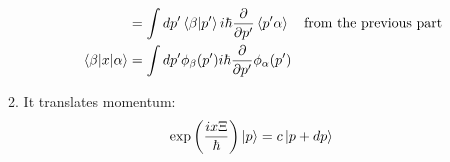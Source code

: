 \documentclass[12pt]{article}
\newcommand{\p}[2]{\frac{\partial #1}{\partial #2}}
\begin{document}
\begin{enumerate}
\begin{enumerate}
\begin{enumerate}
\begin{align*}
          &=\int dp'\braket{\beta|p'}i\hbar\p{}{p'}\braket{p'\alpha}\quad\text{from the previous part}\\
          \braket{\beta|x|\alpha}&=\int dp'\phi_{\beta}(p')i\hbar\p{}{p'}\phi_{\alpha}(p')\\
        \end{align*}
      \end{enumerate}
      \item It translates momentum:
      \begin{gather*}
        \exp\left( \frac{ix\Xi}{\hbar} \right)\ket{p}=c\ket{p+dp}
      \end{gather*}
    \end{enumerate}
  \end{enumerate}
\end{document}

